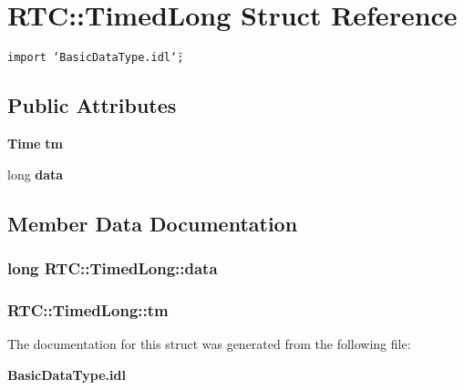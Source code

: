 \section{RTC::Timed\-Long Struct Reference}
\label{structRTC_1_1TimedLong}
{\tt import \char`\"{}Basic\-Data\-Type.idl\char`\"{};}

\subsection*{Public Attributes}
\begin{CompactItemize}
\item 
{\bf Time} {\bf tm}
\item 
long {\bf data}
\end{CompactItemize}


\subsection{Member Data Documentation}
\subsubsection{\setlength{\rightskip}{0pt plus 5cm}long {\bf RTC::Timed\-Long::data}}\label{structRTC_1_1TimedLong_RTC_1_1TimedLongo1}


\subsubsection{ {\bf RTC::Timed\-Long::tm}}\label{structRTC_1_1TimedLong_RTC_1_1TimedLongo0}




The documentation for this struct was generated from the following file:\begin{CompactItemize}
\item 
{\bf Basic\-Data\-Type.idl}\end{CompactItemize}
